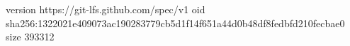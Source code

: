version https://git-lfs.github.com/spec/v1
oid sha256:1322021e409073ac190283779cb5d1f14f651a44d0b48df8fedbfd210fecbae0
size 393312
